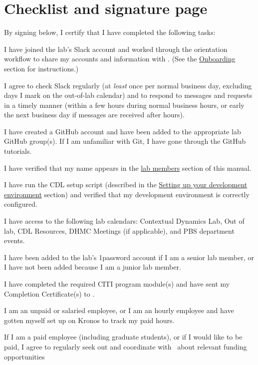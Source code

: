 \documentclass{tufte-book} %
\begin{document}
\chapter{Checklist and signature page}

   By signing below, I certify that I have completed the following tasks:
   \begin{todolist}
     \item I have joined the lab's Slack account and worked through the
    orientation workflow to share my accounts and information with
    \director.  (See the \hyperref[sec:onboarding]{Onboarding}
    section for instructions.)
    \item I agree to check Slack
    regularly (at \textit{least} once per normal business day, excluding days I
    mark on the out-of-lab calendar) and to respond to messages and
    requests in a timely manner (within a few hours during normal
    business hours, or early the next business day if messages are
    received after hours).
  \item I have created a GitHub account and have been added to the appropriate lab
    GitHub group(s).  If I am unfamiliar with Git, I have gone through
    the GitHub tutorials.
  \item I have verified that my name appears in the
  \hyperref[sec:curr_members]{lab members} section of this manual.
  \item I have run the CDL setup script (described in the
  \hyperref[sec:dev-environment]{Setting up your development environment}
  section) and verified that my development environment is correctly
  configured.
  \item I have access to the following lab calendars:
    Contextual Dynamics Lab, Out of lab, CDL Resources, DHMC Meetings (if
    applicable), and PBS department events.
  \item I have been added to the lab's 1password account if I am a
    senior lab member, or I have not been added because I am a junior
    lab member.
  \item I have completed the required CITI program module(s) and have
    sent my Completion Certificate(s) to \coordinator.
  \item I am an unpaid or salaried employee, or I am an hourly
    employee and have gotten myself set up on Kronos to track my paid
    hours.
    \item If I am a paid employee (including graduate students), or if
      I would like to be paid, I agree to regularly seek out and
      coordinate with \director~about relevant funding opportunities

\end{todolist}
\end{document}
